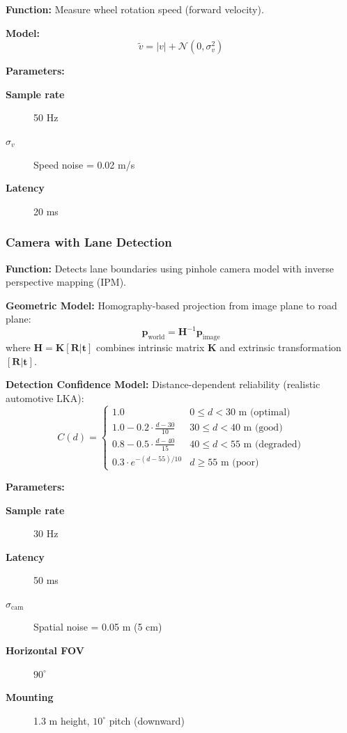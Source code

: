 \documentclass[12pt]{article}
\begin{document}
\textbf{Function:} Measure wheel rotation speed (forward velocity).

\textbf{Model:}
\begin{equation}
\tilde{v} = |v| + \mathcal{N}(0, \sigma_v^2)
\end{equation}

	\textbf{Parameters:}
\begin{description}
    \item[\textbf{Sample rate}] 50 Hz
    \item[\textbf{$\sigma_v$}] Speed noise = 0.02 m/s
    \item[\textbf{Latency}] 20 ms
\end{description}

\subsubsection{Camera with Lane Detection}

\textbf{Function:} Detects lane boundaries using pinhole camera model with inverse perspective mapping (IPM).

\textbf{Geometric Model:} Homography-based projection from image plane to road plane:
\begin{equation}
\mathbf{p}_{\text{world}} = \mathbf{H}^{-1} \mathbf{p}_{\text{image}}
\end{equation}
where $\mathbf{H} = \mathbf{K} [\mathbf{R} | \mathbf{t}]$ combines intrinsic matrix $\mathbf{K}$ and extrinsic transformation $[\mathbf{R} | \mathbf{t}]$.

\textbf{Detection Confidence Model:} Distance-dependent reliability (realistic automotive LKA):
\begin{equation}
C(d) = \begin{cases}
1.0 & 0 \leq d < 30 \text{ m (optimal)} \\
1.0 - 0.2 \cdot \frac{d-30}{10} & 30 \leq d < 40 \text{ m (good)} \\
0.8 - 0.5 \cdot \frac{d-40}{15} & 40 \leq d < 55 \text{ m (degraded)} \\
0.3 \cdot e^{-(d-55)/10} & d \geq 55 \text{ m (poor)}
\end{cases}
\end{equation}

	\textbf{Parameters:}
\begin{description}
    \item[\textbf{Sample rate}] 30 Hz
    \item[\textbf{Latency}] 50 ms
    \item[\textbf{$\sigma_{\text{cam}}$}] Spatial noise = 0.05 m (5 cm)
    \item[\textbf{Horizontal FOV}] $90^{\circ}$
    \item[\textbf{Mounting}] 1.3 m height, $10^{\circ}$ pitch (downward)
\end{description}
\end{document}
